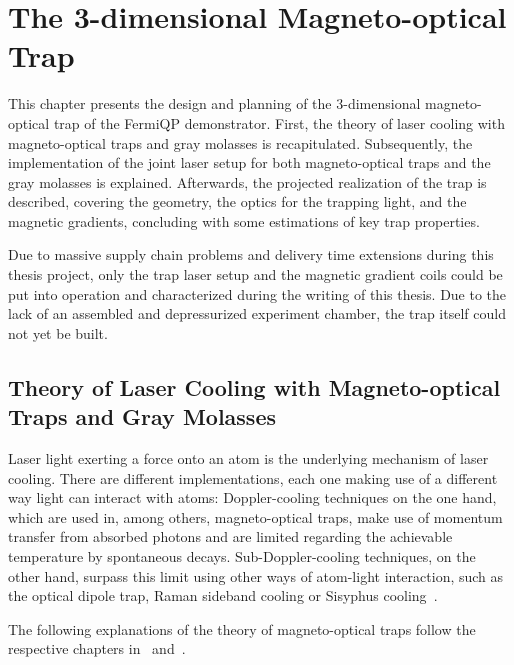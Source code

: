 \renewcommand{\imagepath}{../30-mot/img}

\chapter{The 3-dimensional Magneto-optical Trap}

This chapter presents the design and planning of the 3-dimensional magneto-optical trap of the FermiQP demonstrator. First, the theory of laser cooling with magneto-optical traps and gray molasses is recapitulated. Subsequently, the implementation of the joint laser setup for both magneto-optical traps and the gray molasses is explained. Afterwards, the projected realization of the trap is described, covering the geometry, the optics for the trapping light, and the magnetic gradients, concluding with some estimations of key trap properties.

Due to massive supply chain problems and delivery time extensions during this thesis project, only the trap laser setup and the magnetic gradient coils could be put into operation and characterized during the writing of this thesis. Due to the lack of an assembled and depressurized experiment chamber, the trap itself could not yet be built. 

\section{Theory of Laser Cooling with Magneto-optical Traps and Gray Molasses}
Laser light exerting a force onto an atom is the underlying mechanism of laser cooling. There are different implementations, each one making use of a different way light can interact with atoms: Doppler-cooling techniques on the one hand, which are used in, among others, magneto-optical traps, make use of momentum transfer from absorbed photons and are limited regarding the achievable temperature by spontaneous decays. Sub-Doppler-cooling techniques, on the other hand, surpass this limit using other ways of atom-light interaction, such as the optical dipole trap, Raman sideband cooling or Sisyphus cooling~\cite{foot_atomic_2005}.

The following explanations of the theory of magneto-optical traps follow the respective chapters in~\cite{foot_atomic_2005} and~\cite{metcalf_laser_1999}.

